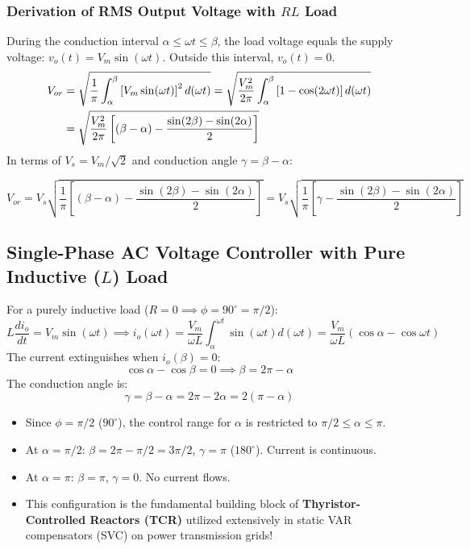 \documentclass[11pt,a4paper]{article}
\begin{document}
\subsubsection{Derivation of RMS Output Voltage with $RL$ Load}
During the conduction interval $\alpha \le \omega t \le \beta$, the load voltage equals the supply voltage: $v_o(t) = V_m \sin(\omega t)$. Outside this interval, $v_o(t) = 0$.
\begin{align}
V_{or} &= \sqrt{\frac{1}{\pi} \int_{\alpha}^{\beta} \left[V_m \sin(\omega t)\right]^2 d(\omega t)} = \sqrt{\frac{V_m^2}{2\pi} \int_{\alpha}^{\beta} \left[1 - \cos(2\omega t)\right] d(\omega t)} \notag\\
&= \sqrt{\frac{V_m^2}{2\pi} \left[ (\beta - \alpha) - \frac{\sin(2\beta) - \sin(2\alpha)}{2} \right]}
\end{align}
In terms of $V_s = V_m / \sqrt{2}$ and conduction angle $\gamma = \beta - \alpha$:
\begin{formulabox}
\begin{equation}
V_{or} = V_s \sqrt{\frac{1}{\pi} \left[ (\beta - \alpha) - \frac{\sin(2\beta) - \sin(2\alpha)}{2} \right]} = V_s \sqrt{\frac{1}{\pi} \left[ \gamma - \frac{\sin(2\beta) - \sin(2\alpha)}{2} \right]}
\label{eq:acvc_rms_rl}
\end{equation}
\end{formulabox}

\subsection{Single-Phase AC Voltage Controller with Pure Inductive ($L$) Load}

For a purely inductive load ($R = 0 \implies \phi = 90^\circ = \pi/2$):
\begin{equation}
L \frac{di_o}{dt} = V_m \sin(\omega t) \implies i_o(\omega t) = \frac{V_m}{\omega L} \int_{\alpha}^{\omega t} \sin(\omega t) d(\omega t) = \frac{V_m}{\omega L} (\cos\alpha - \cos\omega t)
\end{equation}
The current extinguishes when $i_o(\beta) = 0$:
\begin{equation}
\cos\alpha - \cos\beta = 0 \implies \beta = 2\pi - \alpha
\end{equation}
The conduction angle is:
\begin{equation}
\gamma = \beta - \alpha = 2\pi - 2\alpha = 2(\pi - \alpha)
\end{equation}
\begin{itemize}[leftmargin=*]
  \item Since $\phi = \pi/2$ ($90^\circ$), the control range for $\alpha$ is restricted to $\pi/2 \le \alpha \le \pi$.
  \item At $\alpha = \pi/2$: $\beta = 2\pi - \pi/2 = 3\pi/2$, $\gamma = \pi$ ($180^\circ$). Current is continuous.
  \item At $\alpha = \pi$: $\beta = \pi$, $\gamma = 0$. No current flows.
  \item This configuration is the fundamental building block of \textbf{Thyristor-Controlled Reactors (TCR)} utilized extensively in static VAR compensators (SVC) on power transmission grids!
\end{itemize}
\end{document}
